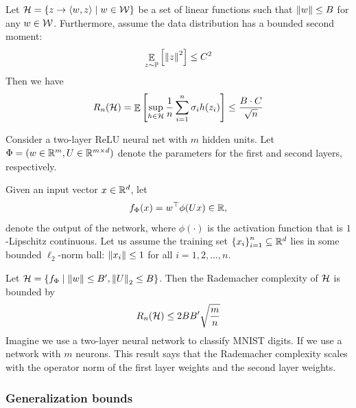 
\begin{example}\label{ex_rad_l2}
    Let $\mathcal{H} = \left\{z \rightarrow \langle w, z \rangle \mid w \in \mathcal{W}\right\}$ be a set of linear functions such that $\left\| w \right\| \le B$ for any $w \in \mathcal{W}$.
    Furthermore, assume the data distribution has a bounded second moment:
    \[ \mathop{\mathbb{E}}_{z\sim\mathbb{P}}\left[ \left\| z \right\|^2  \right] \le C^2 \]
    Then we have
    \[ R_n(\mathcal{H}) = \mathop{\mathbb{E}}\left[ \sup_{h\in\mathcal{H}} \frac 1 n \sum_{i=1}^n \sigma_i h(z_i) \right] \le \frac {B \cdot C} {\sqrt n} \]
\end{example}

\begin{example}\label{ex_rad_nn2}
    Consider a two-layer ReLU neural net with $m$ hidden units.
    Let $\Phi = (w \in \mathbb{R}^m, U\in \mathbb{R}^{m\times d})$ denote the parameters for the first and second layers, respectively.
    
    Given an input vector $x\in\mathbb{R}^d$, let
    \[ f_{\Phi}(x) = w^{\top} \phi(Ux) \in \mathbb{R}, \]
    denote the output of the network, where $\phi(\cdot)$ is the activation function that is $1$-Lipschitz continuous.
    Let us assume the training set $\left\{x_i\right\}_{i=1}^n \subseteq \mathbb{R}^d$ lies in some bounded $\ell_2$-norm ball: $\left\| x_i \right\| \le 1$ for all $i = 1, 2, \dots, n$.

    Let $\mathcal{H}=\left\{ f_{\Phi} \mid \left\| w \right\| \le B', \left\| U \right\|_{2} \le B \right\}$. Then the Rademacher complexity of $\mathcal{H}$ is bounded by \[ R_n(\mathcal{H}) \le 2B B' \sqrt{\frac {m} {n}} \]
    Imagine we use a two-layer neural network to classify MNIST digits. If we use a network with $m$ neurons. This result says that the Rademacher complexity scales with the operator norm of the first layer weights and the second layer weights.
\end{example}

\subsubsection{Generalization bounds}

